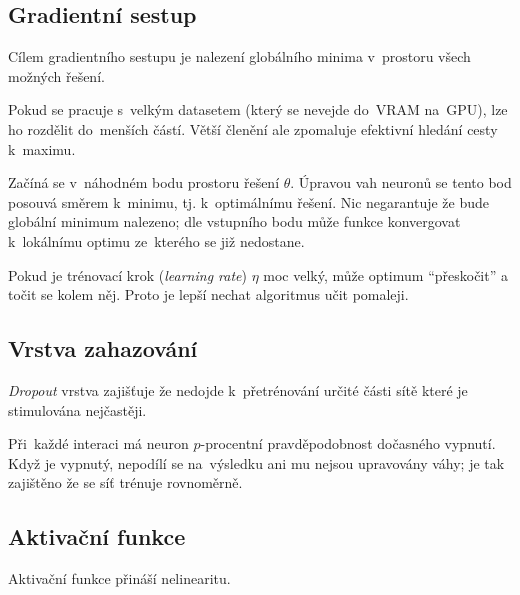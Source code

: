 \subsection{Gradientní sestup}

Cílem gradientního sestupu je nalezení globálního minima v~prostoru všech možných řešení.

Pokud se pracuje s~velkým datasetem (který se nevejde do~VRAM na~GPU), lze ho rozdělit do~menších částí.
Větší členění ale zpomaluje efektivní hledání cesty k~maximu.

Začíná se v~náhodném bodu prostoru řešení $\theta$.
Úpravou vah neuronů se tento bod posouvá směrem k~minimu, tj. k~optimálnímu řešení.
Nic negarantuje že bude globální minimum nalezeno; dle vstupního bodu může funkce konvergovat k~lokálnímu optimu ze~kterého se již nedostane.

Pokud je trénovací krok (\emph{learning rate}) $\eta$ moc velký, může optimum \enquote{přeskočit} a točit se kolem něj. Proto je lepší nechat algoritmus učit pomaleji.

\subsection{Vrstva zahazování}

\emph{Dropout} vrstva zajišťuje že nedojde k~přetrénování určité části sítě které je stimulována nejčastěji.

Při~každé interaci má neuron $p$-procentní pravděpodobnost dočasného vypnutí.
Když je vypnutý, nepodílí se na~výsledku ani mu nejsou upravovány váhy; je tak zajištěno že se síť trénuje rovnoměrně.

\subsection{Aktivační funkce}

Aktivační funkce přináší nelinearitu.

